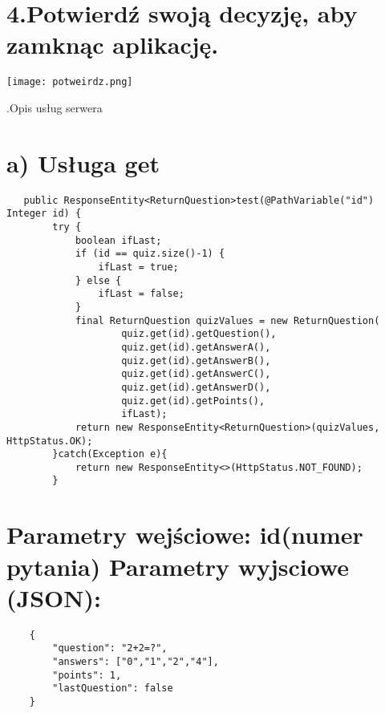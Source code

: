 \documentclass[a4paper]{article}
\newcounter{para}
\newcommand\mypara{\par \refstepcounter {para} \huge \textbf \thepara.\space}\usepackage[T1]{fontenc}
\begin{document}
\section*{\large\hspace*{8mm} 4.Potwierdź swoją decyzję, aby zamknąc aplikację.}\par
\begin{center}
\texttt{[image: potweirdz.png]}
\end{center}

\mypara Opis usług serwera
\section*{\large\hspace*{8mm} a) Usługa get}\par
\small
\begin{lstlisting}
   public ResponseEntity<ReturnQuestion>test(@PathVariable("id") Integer id) {
        try {
            boolean ifLast;
            if (id == quiz.size()-1) {
                ifLast = true;
            } else {
                ifLast = false;
            }
            final ReturnQuestion quizValues = new ReturnQuestion(
                    quiz.get(id).getQuestion(),
                    quiz.get(id).getAnswerA(),
                    quiz.get(id).getAnswerB(),
                    quiz.get(id).getAnswerC(),
                    quiz.get(id).getAnswerD(),
                    quiz.get(id).getPoints(),
                    ifLast);
            return new ResponseEntity<ReturnQuestion>(quizValues, HttpStatus.OK);
        }catch(Exception e){
            return new ResponseEntity<>(HttpStatus.NOT_FOUND);
        }
\end{lstlisting}
\section*{\large\hspace*{8mm}Parametry wejściowe: id(numer pytania)\newline
\hspace*{8mm}Parametry wyjsciowe (JSON):}\par
\small
\begin{lstlisting}
    {
        "question": "2+2=?",
        "answers": ["0","1","2","4"],
        "points": 1,
        "lastQuestion": false
    }
\end{lstlisting}
\end{document}
